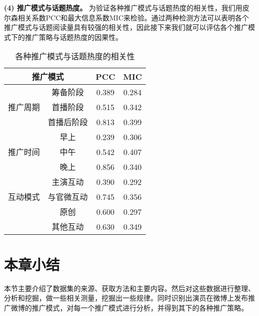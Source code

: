 \textbf{(4) 推广模式与话题热度。}
为验证各种推广模式与话题热度的相关性，我们用皮尔森相关系数PCC和最大信息系数MIC\cite{10}来检验。通过两种检测方法可以表明各个推广模式与话题阅读量具有较强的相关性，因此接下来我们就可以评估各个推广模式下的推广策略与话题热度的因果性。

\begin{table}[!htbp]
\centering
\caption{各种推广模式与话题热度的相关性}
\begin{tabular}{|c|c|c|c|} \hline
\multicolumn{2}{|c|}{推广模式}&PCC&MIC\\ \hline
\multirow{3}{*}{推广周期} & 筹备阶段&0.389&0.284\\%
&首播阶段&0.515&0.342\\%
&首播后阶段&0.813&0.399\\ \hline
\multirow{3}{*}{推广时间} &早上&0.239&0.306\\%
&中午&0.542&0.407\\%
&晚上&0.856&0.340\\ \hline
\multirow{3}{*}{互动模式} &主演互动&0.390&0.292\\%
&与官微互动&0.745&0.356\\%
&原创&0.600&0.297\\ 
&其他互动&0.630&0.349\\ 
\hline\end{tabular}
\end{table}

\section{本章小结}

本节主要介绍了数据集的来源、获取方法和主要内容。然后对这些数据进行整理、分析和挖掘，做一些相关测量，挖掘出一些规律。同时识别出演员在微博上发布推广微博的推广模式，对每一个推广模式进行分析，并得到其下的各种推广策略。




















































